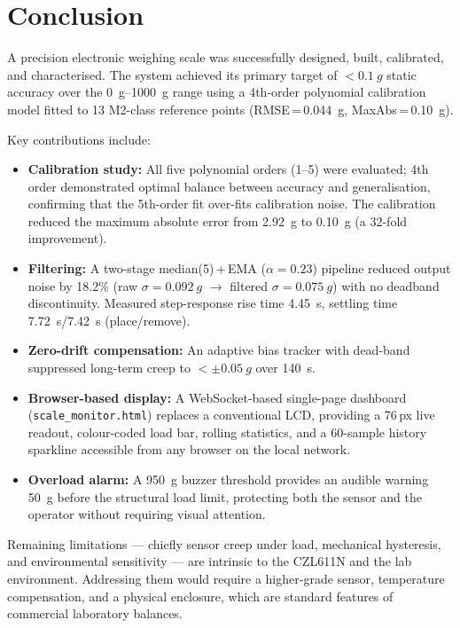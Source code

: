 \documentclass[12pt,a4paper]{article}
\begin{document}
\section{Conclusion}

A precision electronic weighing scale was successfully designed, built, calibrated, and
characterised. The system achieved its primary target of $<\SI{0.1}{g}$ static accuracy
over the \SIrange{0}{1000}{g} range using a 4th-order polynomial calibration model
fitted to 13 M2-class reference points (RMSE\,=\,\SI{0.044}{g}, MaxAbs\,=\,\SI{0.10}{g}).

Key contributions include:
\begin{itemize}
  \item \textbf{Calibration study:} All five polynomial orders (1--5) were evaluated;
        4th order demonstrated optimal balance between accuracy and generalisation,
        confirming that the 5th-order fit over-fits calibration noise. The calibration
        reduced the maximum absolute error from \SI{2.92}{g} to \SI{0.10}{g}
        (a 32-fold improvement).
  \item \textbf{Filtering:} A two-stage median(5)\,+\,EMA ($\alpha=0.23$) pipeline
        reduced output noise by 18.2\% (raw $\sigma=\SI{0.092}{g}$ $\to$ filtered
        $\sigma=\SI{0.075}{g}$) with no deadband discontinuity. Measured step-response
        rise time \SI{4.45}{s}, settling time \SI{7.72}{s}/\SI{7.42}{s}
        (place/remove).
  \item \textbf{Zero-drift compensation:} An adaptive bias tracker with dead-band
        suppressed long-term creep to $<\pm\SI{0.05}{g}$ over \SI{140}{s}.
  \item \textbf{Browser-based display:} A WebSocket-based single-page dashboard
        (\texttt{scale\_monitor.html}) replaces a conventional LCD, providing a 76\,px
        live readout, colour-coded load bar, rolling statistics, and a 60-sample history
        sparkline accessible from any browser on the local network.
  \item \textbf{Overload alarm:} A \SI{950}{g} buzzer threshold provides an audible
        warning \SI{50}{g} before the structural load limit, protecting both the sensor
        and the operator without requiring visual attention.
\end{itemize}

Remaining limitations --- chiefly sensor creep under load, mechanical hysteresis, and
environmental sensitivity --- are intrinsic to the CZL611N and the lab environment.
Addressing them would require a higher-grade sensor, temperature compensation, and a
physical enclosure, which are standard features of commercial laboratory balances.
\end{document}
